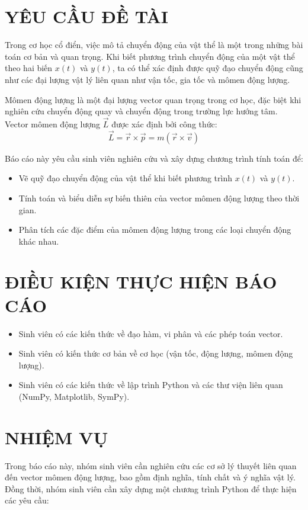 \documentclass{report}
\begin{document}
\section{YÊU CẦU ĐỀ TÀI}
Trong cơ học cổ điển, việc mô tả chuyển động của vật thể là một trong những bài toán cơ bản và quan trọng. Khi biết phương trình chuyển động của một vật thể theo hai biến $x(t)$ và $y(t)$, ta có thể xác định được quỹ đạo chuyển động cũng như các đại lượng vật lý liên quan như vận tốc, gia tốc và mômen động lượng.

Mômen động lượng là một đại lượng vector quan trọng trong cơ học, đặc biệt khi nghiên cứu chuyển động quay và chuyển động trong trường lực hướng tâm. Vector mômen động lượng $\vec{L}$ được xác định bởi công thức:
\[\vec{L} = \vec{r} \times \vec{p} = m(\vec{r} \times \vec{v})\]

Báo cáo này yêu cầu sinh viên nghiên cứu và xây dựng chương trình tính toán để:
\begin{itemize}
    \item Vẽ quỹ đạo chuyển động của vật thể khi biết phương trình $x(t)$ và $y(t)$.
    \item Tính toán và biểu diễn sự biến thiên của vector mômen động lượng theo thời gian.
    \item Phân tích các đặc điểm của mômen động lượng trong các loại chuyển động khác nhau.
\end{itemize}

\section{ĐIỀU KIỆN THỰC HIỆN BÁO CÁO}
\begin{itemize}
    \item Sinh viên có các kiến thức về đạo hàm, vi phân và các phép toán vector.
    \item Sinh viên có kiến thức cơ bản về cơ học (vận tốc, động lượng, mômen động lượng).
    \item Sinh viên có các kiến thức về lập trình Python và các thư viện liên quan (NumPy, Matplotlib, SymPy).
\end{itemize}

\section{NHIỆM VỤ}
Trong báo cáo này, nhóm sinh viên cần nghiên cứu các cơ sở lý thuyết liên quan đến vector mômen động lượng, bao gồm định nghĩa, tính chất và ý nghĩa vật lý. Đồng thời, nhóm sinh viên cần xây dựng một chương trình Python để thực hiện các yêu cầu:
\end{document}
